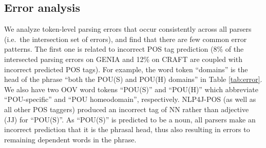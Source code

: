 \documentclass[twocolumn,hyperref]{bmcart}\pdfoutput=1
\newcommand{\CHANGEA}[1]{#1}
\begin{document}
\begin{table}[!t]
\centering
\caption{Error examples. ``H.'' denotes the  head index of the current word.  }
\label{tab:error}
\end{table}


\subsection*{Error analysis}
We analyze \CHANGEA{token-level parsing errors that occur consistently across all parsers (i.e.\ the intersection set of errors)}, and find that there are few common error patterns.  \CHANGEA{The first one is related to incorrect POS tag prediction (8\% of the intersected parsing errors on GENIA and 12\% on CRAFT are coupled with incorrect predicted POS tags).} For example,  the word token ``domains'' is the head of the phrase ``both the POU(S) and POU(H) domains''   \CHANGEA{in Table  \ref{tab:error}.} We also have two OOV word tokens ``POU(S)'' and ``POU(H)'' which abbreviate ``POU-specific'' and ``POU homeodomain'', respectively.  NLP4J-POS (as well as all other POS taggers) produced an incorrect tag of NN rather than adjective (JJ) for ``POU(S)''. As ``POU(S)'' is predicted to be a noun, all parsers make an incorrect  prediction that it is the phrasal head,  \CHANGEA{thus also resulting in errors to remaining dependent words in the phrase.}
\end{document}
